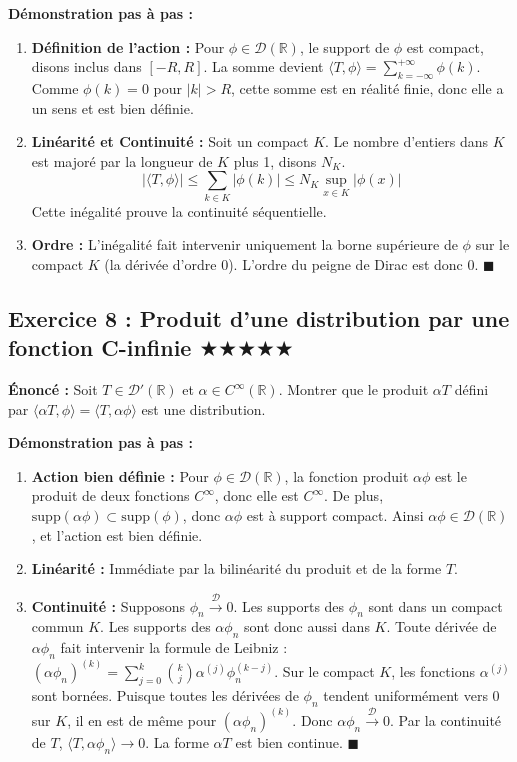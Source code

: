 \documentclass[11pt,a4paper]{article}
\begin{document}
\textbf{Démonstration pas à pas :}
\begin{enumerate}
\item \textbf{Définition de l'action :} Pour $\phi \in \mathcal{D}(\mathbb{R})$, le support de $\phi$ est compact, disons inclus dans $[-R, R]$.
   La somme devient $\langle T, \phi \rangle = \sum_{k=-\infty}^{+\infty} \phi(k)$.
   Comme $\phi(k) = 0$ pour $|k| > R$, cette somme est en réalité finie, donc elle a un sens et est bien définie.
\item \textbf{Linéarité et Continuité :} Soit un compact $K$. Le nombre d'entiers dans $K$ est majoré par la longueur de $K$ plus 1, disons $N_K$.
   $$ |\langle T, \phi \rangle| \le \sum_{k \in K} |\phi(k)| \le N_K \sup_{x \in K} |\phi(x)| $$
   Cette inégalité prouve la continuité séquentielle.
\item \textbf{Ordre :} L'inégalité fait intervenir uniquement la borne supérieure de $\phi$ sur le compact $K$ (la dérivée d'ordre 0). L'ordre du peigne de Dirac est donc 0. $\blacksquare$
\end{enumerate}




\subsection*{Exercice 8 : Produit d'une distribution par une fonction C-infinie \quad $\bigstar\bigstar\bigstar\bigstar\bigstar$}

\textbf{Énoncé :}
Soit $T \in \mathcal{D}'(\mathbb{R})$ et $\alpha \in C^\infty(\mathbb{R})$. Montrer que le produit $\alpha T$ défini par $\langle \alpha T, \phi \rangle = \langle T, \alpha \phi \rangle$ est une distribution.

\textbf{Démonstration pas à pas :}
\begin{enumerate}
\item \textbf{Action bien définie :} Pour $\phi \in \mathcal{D}(\mathbb{R})$, la fonction produit $\alpha \phi$ est le produit de deux fonctions $C^\infty$, donc elle est $C^\infty$.
   De plus, $\text{supp}(\alpha \phi) \subset \text{supp}(\phi)$, donc $\alpha \phi$ est à support compact. Ainsi $\alpha \phi \in \mathcal{D}(\mathbb{R})$, et l'action est bien définie.
\item \textbf{Linéarité :} Immédiate par la bilinéarité du produit et de la forme $T$.
\item \textbf{Continuité :} Supposons $\phi_n \xrightarrow{\mathcal{D}} 0$. Les supports des $\phi_n$ sont dans un compact commun $K$.
   Les supports des $\alpha \phi_n$ sont donc aussi dans $K$.
   Toute dérivée de $\alpha \phi_n$ fait intervenir la formule de Leibniz : $(\alpha \phi_n)^{(k)} = \sum_{j=0}^k \binom{k}{j} \alpha^{(j)} \phi_n^{(k-j)}$.
   Sur le compact $K$, les fonctions $\alpha^{(j)}$ sont bornées. Puisque toutes les dérivées de $\phi_n$ tendent uniformément vers 0 sur $K$, il en est de même pour $(\alpha \phi_n)^{(k)}$.
   Donc $\alpha \phi_n \xrightarrow{\mathcal{D}} 0$. Par la continuité de $T$, $\langle T, \alpha \phi_n \rangle \to 0$.
   La forme $\alpha T$ est bien continue. $\blacksquare$
\end{enumerate}
\end{document}

